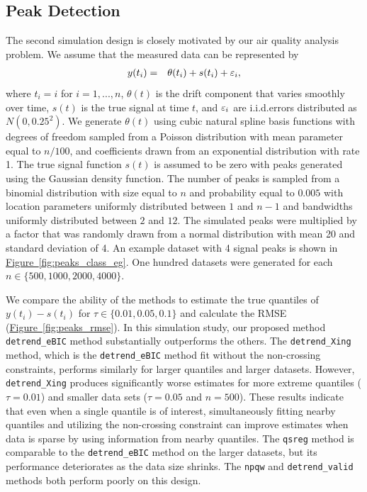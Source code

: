 \documentclass[aoas]{imsart}
\newcommand{\Fig}[1]{\hyperref[fig:#1]{Figure~\ref*{fig:#1}}} %
\newcommand{\Fig}[1]{{Figure~\ref{fig:#1}}} %
\newcommand{\VE}[2]{\MakeLowercase{#1}_{#2}} %
\begin{document}
\subsection{Peak Detection}
\label{sec:peak_detection}
The second simulation design is closely motivated by our air quality analysis problem. We assume that the measured data can be represented by
\begin{eqnarray*}
	y(t_i) & = & \theta(t_i) + s(t_i) + \VE{\varepsilon}{i},
\end{eqnarray*}
where $t_i = i$ for $i = 1, ..., n$, $\theta(t)$ is the drift component that varies smoothly over time, $s(t)$ is the true signal at time $t$, and $\VE{\varepsilon}{i}$ are i.i.d.\@ errors distributed as $N(0, 0.25^2)$. We generate $\theta(t)$ using cubic natural spline basis functions with degrees of freedom sampled from a Poisson distribution with mean parameter equal to $n/100$,  and coefficients drawn from an exponential distribution with rate 1. The true signal function $s(t)$ is assumed to be zero with peaks generated using the Gaussian density function. The number of peaks is sampled from a binomial distribution with size equal to $n$ and probability equal to $0.005$ with location parameters uniformly distributed between $1$ and $n-1$ and bandwidths uniformly distributed between $2$ and $12$. The simulated peaks were multiplied by a factor that was randomly drawn from a normal distribution with mean 20 and standard deviation of 4. An example dataset with 4 signal peaks is shown in \Fig{peaks_class_eg}. One hundred datasets were generated for each $n\in \{500, 1000, 2000, 4000\}$. 

We compare the ability of the methods to estimate the true quantiles of $y(t_i)-s(t_i)$  for $\tau \in \{0.01, 0.05, 0.1\}$ and calculate the RMSE (\Fig{peaks_rmse}). In this simulation study, our proposed method \texttt{detrend\_eBIC} method substantially outperforms the others. The \texttt{detrend\_Xing} method, which is the \texttt{detrend\_eBIC} method fit without the non-crossing constraints, performs similarly for larger quantiles and larger datasets. However, \texttt{detrend\_Xing} produces significantly worse estimates for more extreme quantiles ($\tau = 0.01$) and smaller data sets ($\tau = 0.05$ and $n = 500$). These results indicate that even when a single quantile is of interest, simultaneously fitting nearby quantiles and utilizing the non-crossing constraint can improve estimates when data is sparse by using information from nearby quantiles. The \texttt{qsreg} method is comparable to the \texttt{detrend\_eBIC} method on the larger datasets, but its performance deteriorates as the data size shrinks. The \texttt{npqw} and \texttt{detrend\_valid} methods both perform poorly on this design.
\end{document}
